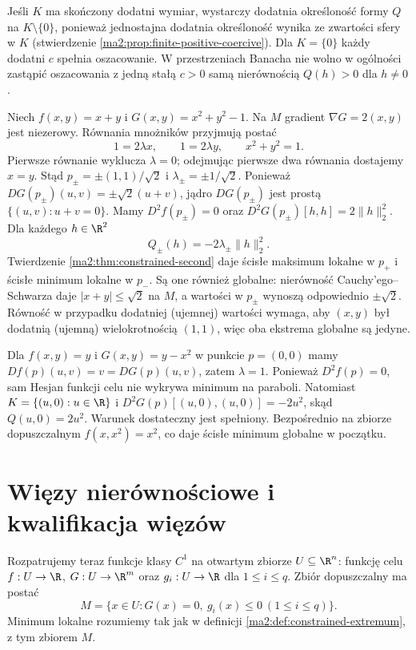 Jeśli $K$ ma skończony dodatni wymiar, wystarczy dodatnia
określoność formy $Q$ na $K\setminus\{0\}$, ponieważ
jednostajna dodatnia określoność wynika ze zwartości sfery
w $K$ (stwierdzenie \ref{ma2:prop:finite-positive-coercive}).
Dla $K=\{0\}$ każdy dodatni $c$ spełnia oszacowanie.
W przestrzeniach Banacha nie wolno w ogólności
zastąpić oszacowania z jedną stałą $c>0$ samą
nierównością $Q(h)>0$ dla $h\ne0$.

\begin{przyklad}
\label{ma2:ex:lagrange-circle}
Niech $f(x,y)=x+y$ i $G(x,y)=x^2+y^2-1$.
Na $M$ gradient $\nabla G=2(x,y)$ jest niezerowy.
Równania mnożników przyjmują postać
\[
 1=2\lambda x,\qquad 1=2\lambda y,\qquad
 x^2+y^2=1.
\]
Pierwsze równanie wyklucza $\lambda=0$; odejmując
pierwsze dwa równania dostajemy $x=y$.
Stąd $p_\pm=\pm(1,1)/\sqrt2$ i
$\lambda_\pm=\pm1/\sqrt2$.
Ponieważ $DG(p_\pm)(u,v)=\pm\sqrt2(u+v)$,
jądro $DG(p_\pm)$ jest prostą $\{(u,v):u+v=0\}$.
Mamy $D^2f(p_\pm)=0$ oraz $D^2G(p_\pm)[h,h]=2\|h\|_2^2$.
Dla każdego $h\in\R^2$
\[
 Q_\pm(h)=-2\lambda_\pm\|h\|_2^2.
\]
Twierdzenie \ref{ma2:thm:constrained-second}
daje ścisłe maksimum lokalne w $p_+$ i ścisłe
minimum lokalne w $p_-$. Są one również globalne:
nierówność Cauchy'ego--Schwarza daje
$|x+y|\le\sqrt2$ na $M$, a wartości w $p_\pm$
wynoszą odpowiednio $\pm\sqrt2$. Równość w przypadku
dodatniej (ujemnej) wartości wymaga, aby $(x,y)$
był dodatnią (ujemną) wielokrotnością $(1,1)$,
więc oba ekstrema globalne są jedyne.
\end{przyklad}

\begin{przyklad}
\label{ma2:ex:constraint-curvature}
Dla $f(x,y)=y$ i $G(x,y)=y-x^2$ w punkcie $p=(0,0)$
mamy $Df(p)(u,v)=v=DG(p)(u,v)$, zatem $\lambda=1$.
Ponieważ $D^2f(p)=0$, sam Hesjan funkcji celu
nie wykrywa minimum na paraboli. Natomiast
$K=\{(u,0):u\in\R\}$ i
$D^2G(p)[(u,0),(u,0)]=-2u^2$, skąd $Q(u,0)=2u^2$.
Warunek dostateczny jest spełniony. Bezpośrednio
na zbiorze dopuszczalnym $f(x,x^2)=x^2$, co daje
ścisłe minimum globalne w początku.
\end{przyklad}

\section{Więzy nierównościowe i kwalifikacja więzów}

Rozpatrujemy teraz funkcje klasy $C^1$ na otwartym
zbiorze $U\subseteq\R^n$: funkcję celu $f:U\to\R$,
$G:U\to\R^m$ oraz $g_i:U\to\R$ dla $1\le i\le q$.
Zbiór dopuszczalny ma postać
\[
 M=\{x\in U:G(x)=0,\ g_i(x)\le0\ (1\le i\le q)\}.
\]
Minimum lokalne rozumiemy tak jak w definicji
\ref{ma2:def:constrained-extremum}, z tym zbiorem $M$.

